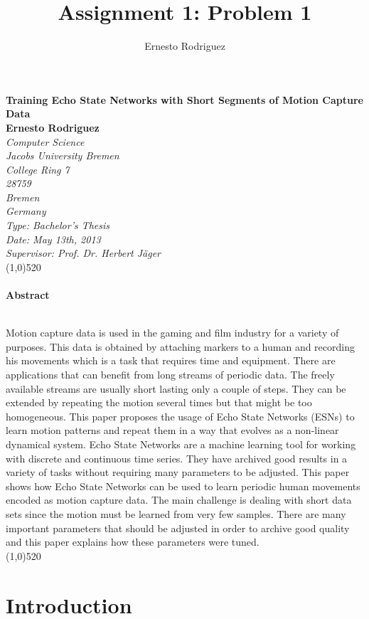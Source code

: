 \documentclass[letterpaper,9pt]{article}
\title{Assignment 1: Problem 1}
\author{Ernesto Rodriguez}
\begin{document}
\Huge{\bf Training Echo State Networks with Short Segments of Motion Capture Data\\[1cm]}
\large{\bf Ernesto Rodriguez\\[0.5cm]}
\emph{Computer Science \\ Jacobs University Bremen \\ College Ring 7 \\ 28759 \\ Bremen \\ Germany\\[0.5cm]}
\emph{Type: Bachelor's Thesis \\ Date: May 13th, 2013 \\ Supervisor: Prof. Dr. Herbert J\"{a}ger\\}
\line(1,0){520}\\ \\
\Large{\bf Abstract\\ \\}

Motion capture data is used in the gaming and film industry for a variety of purposes. This data is obtained by attaching markers to a human and recording his movements which is a task that requires time and equipment. There are applications that can benefit from long streams of periodic data. The freely available streams are usually short lasting only a couple of steps. They can be extended by repeating the motion several times but that might be too homogeneous. This paper proposes the usage of Echo State Networks (ESNs) to learn motion patterns and repeat them in a way that evolves as a non-linear dynamical system. Echo State Networks are a machine learning tool for working with discrete and continuous time series. They have archived good results in a variety of tasks without requiring many parameters to be adjusted. This paper shows how Echo State Networks can be used to learn periodic human movements encoded as motion capture data. The main challenge is dealing with short data sets since the motion must be learned from very few samples. There are many important parameters that should be adjusted in order to archive good quality and this paper explains how these parameters were tuned. \\

\noindent\line(1,0){520}

\pagebreak

\tableofcontents

\pagebreak

\section{Introduction}
\end{document}
